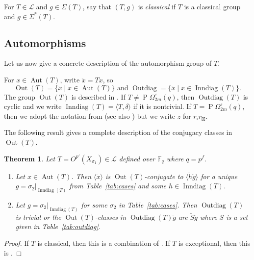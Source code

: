 \documentclass[11pt]{article}
\numberwithin{equation}{section}
\theoremstyle{shdefinition}
\theoremstyle{shplain}
\newtheorem{theorem}[definition]{Theorem}
\renewcommand{\d}{\delta}
\newcommand{\e}{\varepsilon}
\newcommand{\s}{\sigma}
\renewcommand{\L}{\mathcal{L}}
\newcommand{\<}{\langle}
\renewcommand{\>}{\rangle}
\newcommand{\Aut}{\operatorname{Aut}}
\newcommand{\Out}{\operatorname{Out}}
\newcommand{\Inndiag}{\operatorname{Inndiag}}
\newcommand{\Outdiag}{\operatorname{Outdiag}}
\newcommand{\F}{\mathbb{F}}
\renewcommand{\:}{\colon}
\newcommand{\Om}{\Omega}
\newcommand{\POm}{\operatorname{P}\!\Om}
\begin{document}
For $T \in \L$ and $g \in \Sigma(T)$, say that $(T,g)$ is \emph{classical} if $T$ is a classical group and $g \in \Sigma^*(T)$.


\subsection{Automorphisms} \label{ss:lie_auto}

Let us now give a concrete description of the automorphism group of $T$.

For $x \in \Aut(T)$, write $\ddot{x} = Tx$, so 
\[
\text{$\Out(T) = \{ \ddot{x} \mid x \in \Aut(T) \}$ \ and \ $\Outdiag = \{\ddot{x} \mid x \in \Inndiag(T) \}$.}
\] 
The group $\Out(T)$ is described in \cite[Theorem~2.5.12]{ref:GorensteinLyonsSolomon98}. If $T \neq \POm^\e_{2m}(q)$, then $\Outdiag(T)$ is cyclic and we write $\Inndiag(T) = \< T, \d\>$ if it is nontrivial. If $T = \POm^\e_{2m}(q)$, then we adopt the notation from \cite[Chapter~2]{ref:KleidmanLiebeck} (see also \cite[Section~5.2]{ref:Harper}) but we write $z$ for $r_\square r_\boxtimes$.

The following result gives a complete description of the conjugacy classes in $\Out(T)$.

\begin{theorem}\label{thm:setups}
Let $T = O^{p'}(X_{\s_1}) \in \L$ defined over $\F_q$ where $q=p^f$.
\begin{enumerate}
\item Let $x \in \Aut(T)$. Then $\< \ddot{x} \>$ is $\Out(T)$-conjugate to $\<\ddot{h}\ddot{g}\>$ for a unique $g = \s_2|_{\Inndiag(T)}$ from Table~\ref{tab:cases} and some $h \in \Inndiag(T)$.
\item Let $g = \s_2|_{\Inndiag(T)}$ for some $\s_2$ in Table~\ref{tab:cases}. Then $\Outdiag(T)$ is trivial or the $\Out(T)$-classes in $\Outdiag(T)\ddot{g}$ are $\ddot{S}\ddot{g}$ where $S$ is a set given in Table~\ref{tab:outdiag}.
\end{enumerate}
\end{theorem}

\begin{proof}
If $T$ is classical, then this is a combination of \cite[Proposition~5.2.15, Remark~5.2.17, Proposition~6.2.6 and Remark~6.2.7]{ref:Harper}. If $T$ is exceptional, then this is \cite[Proposition~3.15]{ref:BurnessGuralnickHarper}.
\end{proof}
\end{document}
